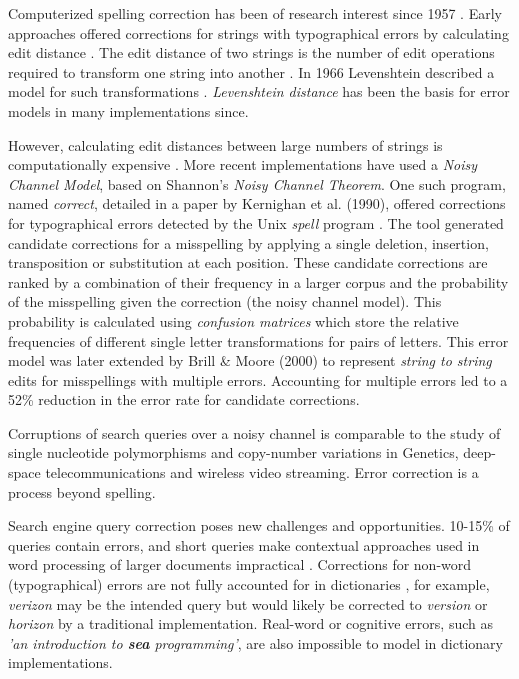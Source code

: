 \documentclass{csfourzero}
\begin{document}
Computerized spelling correction has been of research interest since 1957 \cite{jameslpeterson1980beginning}. Early approaches offered corrections for strings with typographical errors by calculating edit distance \cite{1992correctiondiscussion}. The edit distance of two strings is the number of edit operations required to transform one string into another \cite{introIR}. In 1966 Levenshtein described a model for such transformations \cite{levenshtein1966binary}. \textit{Levenshtein distance} has been the basis for error models in many implementations since.

However, calculating edit distances between large numbers of strings is computationally expensive \cite{2009adaptivespellchecker}. More recent implementations have used a \textit{Noisy Channel Model}, based on Shannon's \textit{Noisy Channel Theorem}. One such program, named \textit{correct}, detailed in a paper by Kernighan et al. (1990), offered corrections for typographical errors detected by the Unix \textit{spell} program \cite{originalnoisychannel}. The tool generated candidate corrections for a misspelling by applying a single deletion, insertion, transposition or substitution at each position. These candidate corrections are ranked by a combination of their frequency in a larger corpus and the probability of the misspelling given the correction (the noisy channel model). This probability is calculated using \textit{confusion matrices} which store the relative frequencies of different single letter transformations for pairs of letters. This error model was later extended by Brill \& Moore (2000) \cite{betternoisychannel} to represent \textit{string to string} edits for misspellings with multiple errors. Accounting for multiple errors led to a 52\% reduction in the error rate for candidate corrections.

Corruptions of search queries over a noisy channel is comparable to the study of single nucleotide polymorphisms and copy-number variations in Genetics, deep-space telecommunications and wireless video streaming. Error correction is a process beyond spelling.

Search engine query correction poses new challenges and opportunities. 10-15\% of queries contain errors, and short queries make contextual approaches used in word processing of larger documents impractical \cite{webuserpoweredspelling}. Corrections for non-word (typographical) errors are not fully accounted for in dictionaries \cite{webuser3}, for example, \textit{verizon} may be the intended query but would likely be corrected to \textit{version} or \textit{horizon} by a traditional implementation. Real-word or cognitive errors, such as \textit{'an introduction to \textbf{sea} programming'}, are also impossible to model in dictionary implementations.
\end{document}

